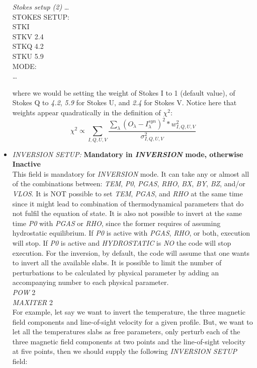 \begin{itemize}
\begin{ifbox}[label={tb:stokes_setup2}]{{\it Stokes setup (2)}}
  \scriptsize
  \ldots\\
  STOKES SETUP:\\
  STKI\\
  STKV  2.4\\
  STKQ  4.2\\
  STKU  5.9\\
  MODE:\\
  \ldots
  \normalsize
\end{ifbox}
  where we would be setting the weight of Stokes I to 1 (default value), of Stokes Q to {\it 4.2}, {\it 5.9} for Stokes U, and {\it 2.4} for Stokes V. Notice here that weights appear quadratically in the definition of $\chi^2$:
  \begin{equation}
  \chi^2\propto\sum_{I,Q,U,V}\frac{\sum_{\lambda}(O_{\lambda}-I^{syn}_{\lambda})^2*w_{I,Q,U,V}^2}{\sigma_{I,Q,U,V}^2}
  \end{equation}
  \item {\it INVERSION SETUP:} {\bf Mandatory in {\it INVERSION} mode, otherwise Inactive}\\
  This field is mandatory for {\it INVERSION} mode. It can take any or almost all of the combinations between: {\it TEM}, {\it P0}, {\it PGAS}, {\it RHO}, {\it BX}, {\it BY}, {\it BZ}, and/or {\it VLOS}. It is NOT possible to set {\it TEM}, {\it PGAS}, and {\it RHO} at the same time since it might lead to combination of thermodynamical parameters that do not fulfil the equation of state. It is also not possible to invert at the same time {\it P0} with {\it PGAS} or {\it RHO}, since the former requires of assuming hydrostatic equilibrium. If {\it P0} is active with {\it PGAS}, {\it RHO}, or both, execution will stop. If {\it P0} is active and {\it HYDROSTATIC} is {\it NO} the code will stop execution. For the inversion, by default, the code will assume that one wants to invert all the available slabs. It is possible to limit the number of perturbations to be calculated by physical parameter by adding an accompanying number to each physical parameter.\\
  {\it POW} 2\\
  {\it MAXITER} 2\\
  For example, let say we want to invert the temperature, the three magnetic field components and line-of-sight velocity for a given profile. But, we want to let all the temperatures slabs as free parameters, only perturb each of the three magnetic field components at two points and the line-of-sight velocity at five points, then we should supply the following {\it INVERSION SETUP} field: \\

\end{itemize}

